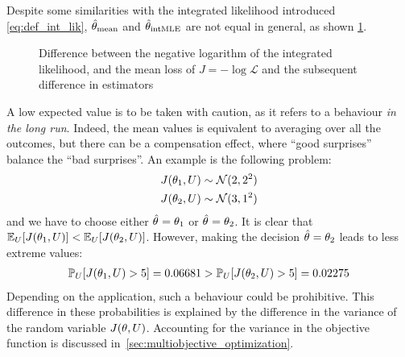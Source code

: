 \documentclass[../../Main_ManuscritThese.tex]{subfiles}
\newcommand\imgpath{/home/victor/acadwriting/Manuscrit/Text/Chapter3/img/}
\begin{document}
Despite some similarities with the integrated likelihood introduced \cref{eq:def_int_lik}, $\hat{\theta}_{\mathrm{mean}}$ and $\hat{\theta}_{\mathrm{intMLE}}$ are not equal in general, as shown \cref{fig:difference_arithmetic_geometric_mean}.
\begin{figure}[ht]
  \centering
  
  \caption{\label{fig:difference_arithmetic_geometric_mean} Difference between the negative logarithm of the integrated likelihood, and the mean loss of $J = -\log \mathcal{L}$ and the subsequent difference in estimators}
\end{figure}



A low expected value is to be taken with caution, as it refers to a behaviour \emph{in the long run}. Indeed, the mean values is equivalent to averaging over all the outcomes, but there can be a compensation effect, where ``good surprises'' balance the ``bad surprises''.
An example is the following problem:
\begin{align}
  J(\theta_1, U) &\sim \mathcal{N}(2, 2^2) \\
  J(\theta_2, U) & \sim \mathcal{N}(3, 1^2)
\end{align}
and we have to choose either $\hat{\theta}_{\mathrm{}}=\theta_1$ or $\hat{\theta}_{\mathrm{}} = \theta_2$.
It is clear that $\mathbb{E}_{U}[J(\theta_1, U)] < \mathbb{E}_{U}[J(\theta_2, U)]$. However, making the decision $\hat{\theta}_{\mathrm{}} = \theta_2$ leads to less extreme values:
\begin{align}
  \mathbb{P}_{U}[J(\theta_1, U) > 5] = 0.06681> \mathbb{P}_{U}[J(\theta_2, U) > 5] = 0.02275
\end{align}
Depending on the application, such a behaviour could be prohibitive.
This difference in these probabilities is explained by the difference in the variance of the random variable $J(\theta, U)$.
Accounting for the variance in the objective function is discussed in~\cref{sec:multiobjective_optimization}.
\end{document}

